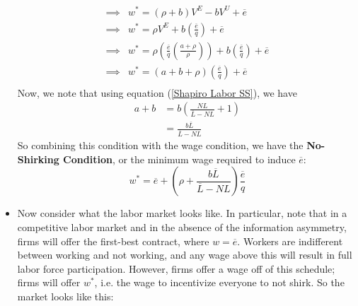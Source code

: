\documentclass[12pt]{article}
\begin{document}
\begin{itemize}
\[\begin{split}
        \implies &w^* = (\rho + b)V^E - bV^U + \overline{e} \\
        \implies &w^* = \rho V^E + b\left(\frac{\overline{e}}{q}\right) + \overline{e} \\
        \implies &w^* = \rho \left(\frac{\overline{e}}{q}\left(\frac{a + \rho}{\rho}\right)\right) + b\left(\frac{\overline{e}}{q}\right) + \overline{e} \\
        \implies &w^* = \left(a + b+ \rho\right)\left(\frac{\overline{e}}{q}\right) + \overline{e} \\
    \end{split}\]
    Now, we note that using equation (\ref{Shapiro Labor SS}), we have
    \[\begin{split}
        a + b &= b\left(\frac{NL}{\overline{L}-NL} +1\right) \\
        &= \frac{b\overline{L}}{\overline{L} - NL}
    \end{split}\]
    So combining this condition with the wage condition, we have the \textbf{No-Shirking Condition}, or the minimum wage required to induce $\overline{e}$:
    \begin{equation}\label{No-Shirking Condition}
        w^* = \overline{e} + \left(\rho + \frac{b\overline{L}}{\overline{L} - NL}\right)\frac{\overline{e}}{q}
    \end{equation}
    \item Now consider what the labor market looks like. In particular, note that in a competitive labor market and in the absence of the information asymmetry, firms will offer the first-best contract, where $w = \overline{e}$. Workers are indifferent between working and not working, and any wage above this will result in full labor force participation. However, firms offer a wage off of this schedule; firms will offer $w^*$, i.e. the wage to incentivize everyone to not shirk. So the market looks like this:
    \begin{center}
        \begin{tikzpicture}[scale=1,thick]
    

\end{tikzpicture}
\end{center}
\end{itemize}
\end{document}
